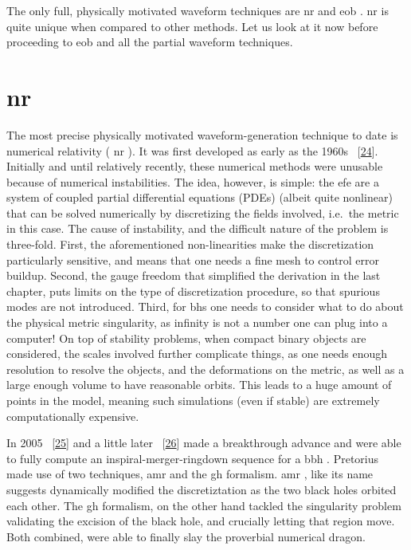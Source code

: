 \documentclass[
  10pt,
  a4paper,
  DIV=11,
  numbers=noendperiod,
  twoside]{scrreprt}
\DeclareRobustCommand{\[}{\begin{equation}}
\DeclareRobustCommand{\]}{\end{equation}}
\begin{document}
The only full, physically motivated waveform techniques are \gls{nr} and
\gls{eob} . \gls{nr} is quite unique when
compared to other methods. Let us look at it now before proceeding to
\gls{eob} and all the partial waveform techniques.

\hypertarget{nr}{%
\section{\texorpdfstring{\gls{nr}}{}}\label{nr}}

The most precise physically motivated waveform-generation technique to
date is numerical relativity ( \gls{nr} ). It was first developed as
early as the 1960s ~{[}\protect\hyperlink{ref-hahn:1964}{24}{]}.
Initially and until relatively recently, these numerical methods were
unusable because of numerical instabilities. The idea, however, is
simple: the \gls{efe} are a system of coupled partial differential
equations (PDEs) (albeit quite nonlinear) that can be solved numerically
by discretizing the fields involved, i.e.~the metric in this case. The
cause of instability, and the difficult nature of the problem is
three-fold. First, the aforementioned non-linearities make the
discretization particularly sensitive, and means that one needs a fine
mesh to control error buildup. Second, the gauge freedom that simplified
the derivation in the last chapter, puts limits on the type of
discretization procedure, so that spurious modes are not introduced.
Third, for \glspl{bh} one needs to consider what to do about the
physical metric singularity, as infinity is not a number one can plug
into a computer! On top of stability problems, when compact binary
objects are considered, the scales involved further complicate things,
as one needs enough resolution to resolve the objects, and the
deformations on the metric, as well as a large enough volume to have
reasonable orbits. This leads to a huge amount of points in the model,
meaning such simulations (even if stable) are extremely computationally
expensive.

In 2005 ~{[}\protect\hyperlink{ref-Pretorius:2005gq}{25}{]} and a little
later ~{[}\protect\hyperlink{ref-Campanelli:2005dd}{26}{]} made a
breakthrough advance and were able to fully compute an
inspiral-merger-ringdown sequence for a \gls{bbh} . Pretorius made use
of two techniques, \gls{amr} and the \gls{gh} formalism. \gls{amr} ,
like its name suggests dynamically modified the discretiztation as the
two black holes orbited each other. The \gls{gh} formalism, on the other
hand tackled the singularity problem validating the excision of the
black hole, and crucially letting that region move. Both combined, were
able to finally slay the proverbial numerical dragon.
\end{document}
